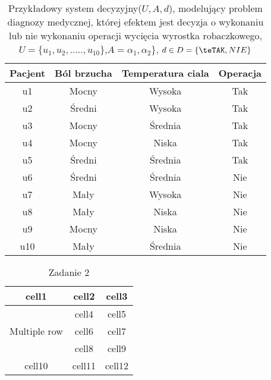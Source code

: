 \documentclass[a4paper]{article}
\author{Arek Mulkityn}
\begin{document}
\begin{table}[h]
\centering\caption{Przykładowy system decyzyjny($U,A,d$), modelujący problem diagnozy medycznej, której efektem jest decyzja o wykonaniu lub nie wykonaniu operacji wycięcia wyrostka robaczkowego,$ U =\{u_{1},u_{2},.....,u_{10}\}$,$ A=\alpha_{1},\alpha_{2}\}$, $d \in D=\{\teTAK,NIE\}$} 
\begin{tabular}{|c|c c c|}
\hline
\hline

Pacjent & Ból brzucha & Temperatura ciala & Operacja \\
\hline
u1 & Mocny & Wysoka & Tak\\
u2 & Średni & Wysoka & Tak\\
u3 & Mocny & Średnia & Tak\\
u4 & Mocny & Niska & Tak\\
u5 & Średni & Średnia & Tak\\ 
u6 & Średni & Średnia & Nie\\
u7 & Mały & Wysoka & Nie\\
u8 & Mały & Niska & Nie\\
u9 & Mocny & Niska & Nie\\
u10 & Mały & Średnia & Nie\\
\hline
\end{tabular}
\end{table}

\begin{table}[h]
\centering\caption{Zadanie 2}
\begin{tabular}{|c|c|c|}
\hline
\hline
cell1 & cell2 & cell3\\
\hline
\multirow{3}{4em}{Multiple row} & cell4 & cell5\\
&cell6 & cell7\\
&cell8 & cell9\\
\hline
cell10 & cell11 & cell12\\
\hline
\end{tabular}
\end{table}
\end{document}
